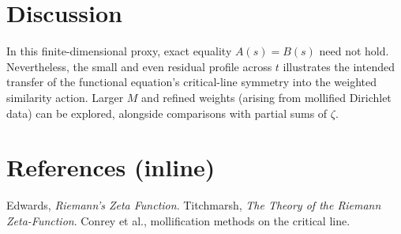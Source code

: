 \documentclass[11pt]{article}
\begin{document}
\section{Discussion}
In this finite-dimensional proxy, exact equality \(A(s)=B(s)\) need not hold. 
Nevertheless, the small and even residual profile across \(t\) illustrates the intended transfer of the functional equation's critical-line symmetry into the weighted similarity action. 
Larger \(M\) and refined weights (arising from mollified Dirichlet data) can be explored, alongside comparisons with partial sums of \(\zeta\).

\section*{References (inline)}
Edwards, \emph{Riemann's Zeta Function}.  
Titchmarsh, \emph{The Theory of the Riemann Zeta-Function}.  
Conrey et al., mollification methods on the critical line.  
\end{document}
